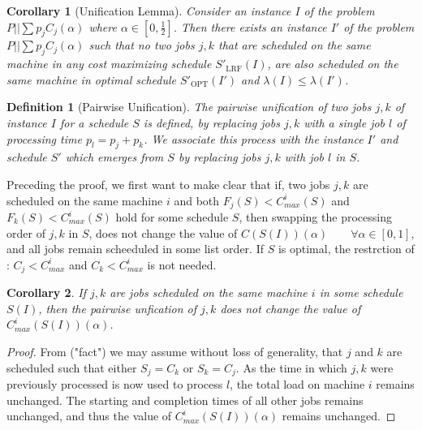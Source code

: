 \documentclass[11pt]{article}
\newtheorem{corollary}{Corollary}
\newtheorem{definition}{Definition}
\newcommand{\LRF}{\mathrm{LRF}}
\newcommand{\OPT}{\mathrm{OPT}}
\begin{document}
\begin{corollary}[Unification Lemma]
    Consider an instance $I$ of the problem $P||\sum p_jC_j(\alpha)$ where $\alpha \in [0,\frac12]$. 
    Then there exists an instance $I'$ of the problem $P||\sum p_jC_j(\alpha)$ such that no two jobs 
    $j,k$ that are scheduled on the same machine in any cost maximizing schedule $S'_{\LRF}(I)$, are also 
    scheduled on the same machine in optimal schedule $S'_{\OPT}(I')$ and $\lambda(I)\le\lambda(I')$. 

\end{corollary}

\begin{definition}[Pairwise Unification]
    The pairwise unification of two jobs $j,k$ of instance $I$ for a schedule $S$ is defined, by replacing jobs $j,k$
    with a single job $l$ of 
    processing time $p_l=p_j+p_k$. We associate this process with the instance $I'$ and schedule $S'$ 
    which emerges from $S$ by replacing jobs $j,k$ with job $l$ in $S$.
\end{definition}

Preceding the proof, we first want to make clear that 
if, two jobs $j,k$ are scheduled on the same machine $i$ and both $F_{j}(S) < C_{max}^{i}(S)$ and 
$F_{k}(S) < C_{max}^{i}(S)$ hold for some schedule $S$,
then swapping the processing order of $j,k$ in $S$, does not change the value of $C(S(I))(\alpha) \qquad \forall \alpha \in [0,1]$,
and all jobs remain scheeduled in some list order.
If $S$ is optimal, the restrction of : $C_{j} < C_{max}^{i}$ and $C_{k} < C_{max}^{i}$ is not needed. 


\begin{corollary}
    If $j,k$ are jobs scheduled on the same machine $i$ in some schedule $S(I)$, then the pairwise unfication
    of $j,k$ does not change the value of $C^{i}_{max}(S(I))(\alpha)$.

\end{corollary}

\begin{proof}
    From ("fact") we may assume without loss of generality, that $j$ and $k$ are scheduled such that either $S_{j} = C_{k}$ or $S_{k} = C_{j}$.
    As the time in which $j,k$ were previously processed is now used to process $l$, the total load on machine $i$ remains unchanged.
    The starting and completion times of all other jobs remains unchanged, and thus the value of $C^{i}_{max}(S(I))(\alpha)$ remains unchanged.
\end{proof}
\end{document}
